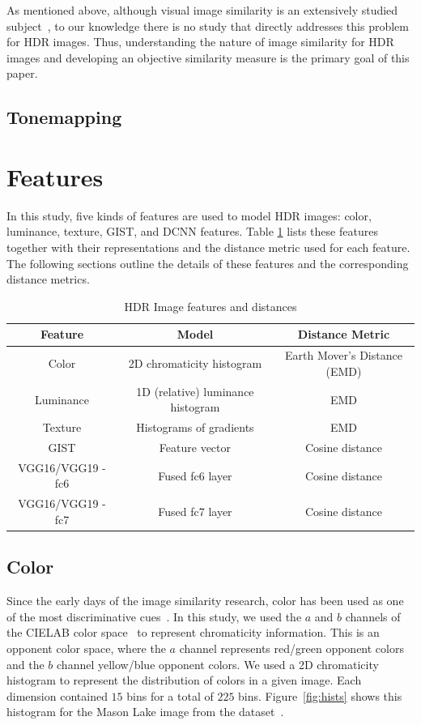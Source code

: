 As mentioned above, although visual image similarity is an extensively studied subject~\cite{liu2007survey}, to our knowledge there is no study that directly addresses this problem for HDR images. Thus, understanding the nature of image similarity for HDR images and developing an objective similarity measure is the primary goal of this paper. 

\subsection{Tonemapping}

\section{Features}
\label{sec:features}
In this study, five kinds of features are used to model HDR images: color, luminance, texture, GIST, and DCNN features. Table \ref{tab:table_feature} lists these features together with their representations and the distance metric used for each feature. The following sections outline the details of these features and the corresponding distance metrics.

\begin{table}[h!]
\caption{HDR Image features and distances}
\centering
\begin{tabular}{c|c|c}
\label{tab:table_feature}
\textbf{Feature} & \textbf{Model} & \textbf{Distance Metric}\\
\hline
Color  & 2D chromaticity histogram & Earth Mover's Distance (EMD) \\
Luminance  & 1D (relative) luminance histogram & EMD \\
Texture  & Histograms of gradients & EMD \\
GIST  & Feature vector & Cosine distance \\
VGG16/VGG19 - fc6 & Fused fc6 layer & Cosine distance  \\
VGG16/VGG19 - fc7 & Fused fc7 layer & Cosine distance
\end{tabular}
\end{table}

\subsection{Color}
Since the early days of the image similarity research, color has been used as one of the most discriminative cues~\cite{neumann2006image}. In this study,  we used the $a$ and $b$ channels of the CIELAB color space~\cite{iso201111664} to represent chromaticity information. This is an opponent color space, where the $a$ channel represents red/green opponent colors and the $b$ channel yellow/blue opponent colors. We used a 2D chromaticity histogram to represent the distribution of colors in a given image. Each dimension contained $15$ bins for a total of $225$ bins.  Figure~\ref{fig:hists} shows this histogram for the Mason Lake image from the
dataset~\cite{fairchild2007hdr}.


